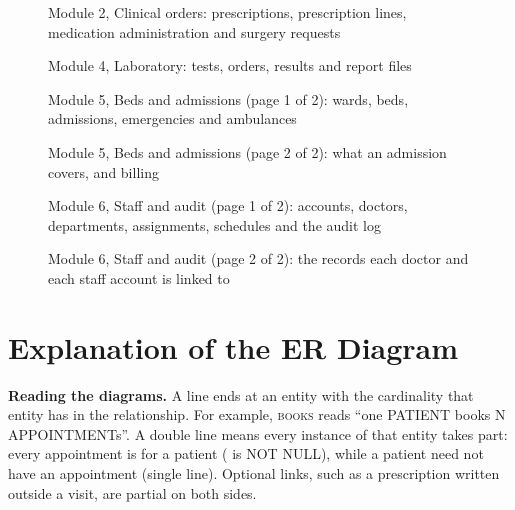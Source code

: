 \begin{figure}[p]\centering
\minilegend
\caption{Module 2, Clinical orders: prescriptions, prescription lines, medication administration and surgery requests}\label{fig:m2}
\end{figure}

\begin{figure}[p]\centering
\minilegend
\caption{Module 4, Laboratory: tests, orders, results and report files}\label{fig:m4}
\end{figure}

\begin{figure}[p]\centering
\minilegend
\caption{Module 5, Beds and admissions (page 1 of 2): wards, beds, admissions, emergencies and ambulances}\label{fig:m5a}
\end{figure}

\begin{figure}[p]\centering
\minilegend
\caption{Module 5, Beds and admissions (page 2 of 2): what an admission covers, and billing}\label{fig:m5b}
\end{figure}

\begin{figure}[p]\centering
\minilegend
\caption{Module 6, Staff and audit (page 1 of 2): accounts, doctors, departments, assignments, schedules and the audit log}\label{fig:m6a}
\end{figure}

\begin{figure}[p]\centering
\minilegend
\caption{Module 6, Staff and audit (page 2 of 2): the records each doctor and each staff account is linked to}\label{fig:m6b}
\end{figure}

\section{Explanation of the ER Diagram}
\textbf{Reading the diagrams.} A line ends at an entity with the cardinality that entity has in the
relationship. For example, \textsc{books} reads ``one PATIENT books N APPOINTMENTs''. A double line means
every instance of that entity takes part: every appointment is for a patient (
is NOT NULL), while a patient need not have an appointment (single line). Optional links, such as a
prescription written outside a visit, are partial on both sides.

